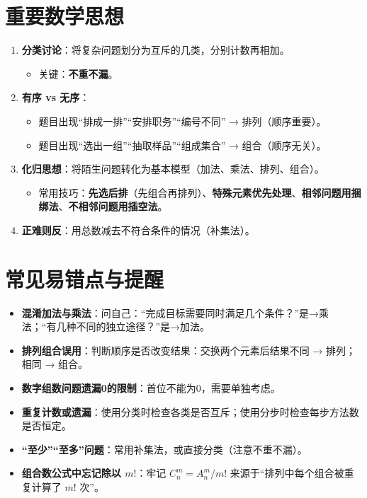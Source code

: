 \documentclass[10pt]{article}
\begin{document}
\section{重要数学思想}

\begin{enumerate}
\item \textbf{分类讨论}：将复杂问题划分为互斥的几类，分别计数再相加。
  \begin{itemize}
  \item 关键：\textbf{不重不漏}。
  \end{itemize}
\item \textbf{有序 vs 无序}：
  \begin{itemize}
  \item 题目出现“排成一排”“安排职务”“编号不同” → 排列（顺序重要）。
  \item 题目出现“选出一组”“抽取样品”“组成集合” → 组合（顺序无关）。
  \end{itemize}
\item \textbf{化归思想}：将陌生问题转化为基本模型（加法、乘法、排列、组合）。
  \begin{itemize}
  \item 常用技巧：\textbf{先选后排}（先组合再排列）、\textbf{特殊元素优先处理}、\textbf{相邻问题用捆绑法}、\textbf{不相邻问题用插空法}。
  \end{itemize}
\item \textbf{正难则反}：用总数减去不符合条件的情况（补集法）。
\end{enumerate}

\section{常见易错点与提醒}

\begin{itemize}
\item \textbf{混淆加法与乘法}：问自己：“完成目标需要同时满足几个条件？”是→乘法；“有几种不同的独立途径？”是→加法。
\item \textbf{排列组合误用}：判断顺序是否改变结果：交换两个元素后结果不同 → 排列；相同 → 组合。
\item \textbf{数字组数问题遗漏0的限制}：首位不能为0，需要单独考虑。
\item \textbf{重复计数或遗漏}：使用分类时检查各类是否互斥；使用分步时检查每步方法数是否恒定。
\item \textbf{“至少”“至多”问题}：常用补集法，或直接分类（注意不重不漏）。
\item \textbf{组合数公式中忘记除以 \(m!\)}：牢记 \(C_n^m = A_n^m / m!\) 来源于“排列中每个组合被重复计算了 \(m!\) 次”。
\end{itemize}
\end{document}

